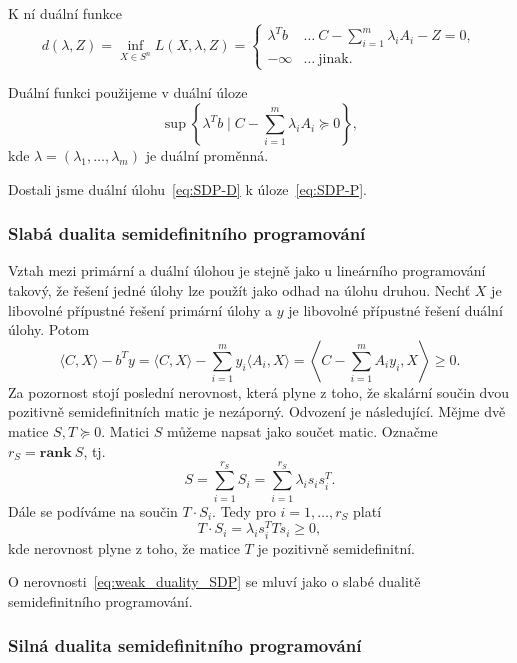 \noindent K ní duální funkce
$$
    d(\lambda, Z) = \inf_{X \in S^n} L(X, \lambda, Z) = 
    \begin{cases}
        \lambda^T b & \dots\ C - \sum_{i=1}^m \lambda_i A_i - Z = 0, \\
        -\infty     & \dots\ \text{jinak.}
    \end{cases}
$$

\noindent Duální funkci použijeme v duální úloze
\begin{equation}\tag{SDP-D}
    \sup\left\{ \lambda^Tb \mid C - \sum_{i=1}^m \lambda_i A_i \succeq 0 \right\},
    \label{eq:SDP-D}
\end{equation}
kde $\lambda = (\lambda_1, \dots, \lambda_m)$ je duální proměnná.

\noindent Dostali jsme duální úlohu~\ref{eq:SDP-D} k úloze~\ref{eq:SDP-P}.

\subsubsection*{Slabá dualita semidefinitního programování}

Vztah mezi primární a duální úlohou je stejně jako u lineárního programování takový, že řešení jedné úlohy lze použít jako odhad na úlohu druhou. Nechť $X$ je libovolné přípustné řešení primární úlohy a $y$ je libovolné přípustné řešení duální úlohy. Potom
\begin{equation}
    \langle C, X \rangle - b^T y =
    \langle C, X \rangle - \sum_{i=1}^m y_i \langle A_i, X \rangle =
    \left\langle C - \sum_{i=1}^m A_i y_i, X \right\rangle \geq 0.
    \label{eq:weak_duality_SDP}
\end{equation}
Za pozornost stojí poslední nerovnost, která plyne z toho, že skalární součin dvou pozitivně semidefinitních matic je nezáporný. Odvození je následující. Mějme dvě matice $S, T \succeq 0$. Matici $S$ můžeme napsat jako součet  matic. Označme $r_S = \textbf{rank}\ S$, tj.
$$
    S = \sum_{i=1}^{r_S} S_i = \sum_{i=1}^{r_S} \lambda_i s_i s_i^T.
$$
Dále se podíváme na součin $T \cdot S_i$. Tedy pro $i = 1, \dots, r_S$ platí
$$
    T \cdot S_i = \lambda_i s_i^T T s_i \geq 0,
$$
kde nerovnost plyne z toho, že matice $T$ je pozitivně semidefinitní.

O nerovnosti~\ref{eq:weak_duality_SDP} se mluví jako o slabé dualitě semidefinitního programování.

\subsubsection*{Silná dualita semidefinitního programování}

